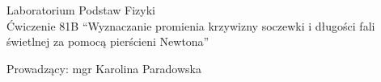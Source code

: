 \documentclass[polish, 11pt, a4paper]{article}
\begin{document}
	\begin{titlepage}
	\centering
	\Huge Laboratorium Podstaw Fizyki\\
	\vspace{1cm}
	\huge Ćwiczenie 81B \enquote{Wyznaczanie promienia krzywizny soczewki i długości fali świetlnej za pomocą pierścieni Newtona}\\
	\vspace{1cm}
	\raggedright
	\huge Prowadzący: mgr Karolina Paradowska\\
	\vspace{.5cm}
	\begin{table}[h]
		\centering
	\end{table}
	\end{titlepage}
\end{document}
